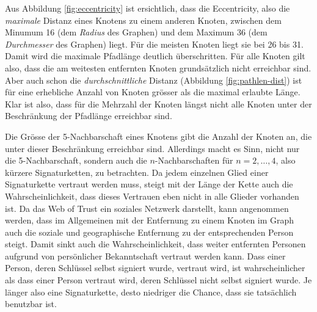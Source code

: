 Aus Abbildung \ref{fig:eccentricity} ist ersichtlich, dass die
Eccentricity, also die \emph{maximale} Distanz eines Knotens zu
einem anderen Knoten, zwischen dem Minumum 16 (dem \emph{Radius}
des Graphen) und dem Maximum 36 (dem \emph{Durchmesser} des Graphen)
liegt. F\"ur die meisten Knoten liegt sie bei 26 bis 31. Damit wird
die maximale Pfadl\"ange deutlich \"uberschritten. F\"ur alle Knoten
gilt also, dass die am weitesten entfernten Knoten grunds\"atzlich
nicht erreichbar sind. Aber auch schon die \emph{durchschnittliche}
Distanz (Abbildung \ref{fig:pathlen-dist}) ist f\"ur eine erhebliche
Anzahl von Knoten gr\"osser als die maximal erlaubte L\"ange. Klar ist
also, dass f\"ur die Mehrzahl der Knoten l\"angst nicht alle Knoten
unter der Beschr\"ankung der Pfadl\"ange erreichbar sind.

Die Gr\"osse der 5-Nachbarschaft eines Knotens gibt die Anzahl der
Knoten an, die unter dieser Beschr\"ankung erreichbar sind. Allerdings
macht es Sinn, nicht nur die 5-Nachbarschaft, sondern auch die
$n$-Nachbarschaften f\"ur $n=2,\dots,4$, also k\"urzere
Signaturketten, zu betrachten. Da jedem einzelnen Glied einer
Signaturkette vertraut werden muss, steigt mit der L\"ange der Kette
auch die Wahrscheinlichkeit, dass dieses Vertrauen eben nicht in alle
Glieder vorhanden ist. Da das Web of Trust ein soziales Netzwerk
darstellt, kann angenommen werden, dass im Allgemeinen mit der
Entfernung zu einem Knoten im Graph auch die soziale und geographische
Entfernung zu der entsprechenden Person steigt. Damit sinkt auch die
Wahrscheinlichkeit, dass weiter entfernten Personen aufgrund von
pers\"onlicher Bekanntschaft vertraut werden kann. Dass einer Person,
deren Schl\"ussel selbst signiert wurde, vertraut wird, ist
wahrscheinlicher als dass einer Person vertraut wird, deren
Schl\"ussel nicht selbst signiert wurde. Je l\"anger also
eine Signaturkette, desto niedriger die Chance, dass sie tats\"achlich
benutzbar ist. 

